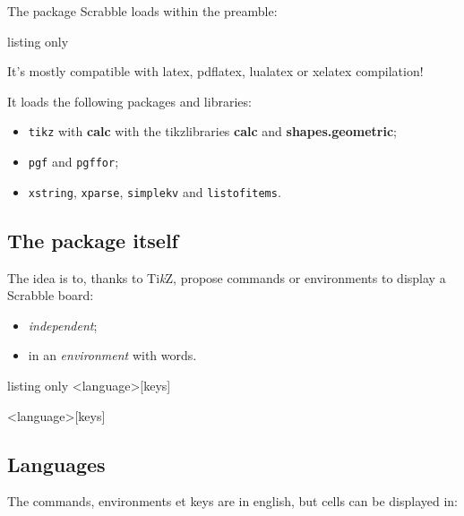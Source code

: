 \documentclass{article}
\newcommand\tikzlogo{Ti\textit{k}Z}
\let\TikZ\tikzlogo
\newcommand\Cle[1]{{\bfseries\sffamily\textlangle #1\textrangle}}
\begin{document}
The package \textsf{Scrabble} loads within the preamble:

\begin{PresentationCode}{listing only}
\usepackage{Scrabble}
\end{PresentationCode}

It's mostly compatible with \textsf{latex}, \textsf{pdflatex}, \textsf{lualatex} or \textsf{xelatex} compilation!

\medskip

It loads the following packages and libraries:

\begin{itemize}
	\item \texttt{tikz} with \Cle{calc} with the tikzlibraries \Cle{calc} and \Cle{shapes.geometric};
	\item \texttt{pgf} and \texttt{pgffor};
	\item \texttt{xstring}, \texttt{xparse}, \texttt{simplekv} and \texttt{listofitems}.
\end{itemize}

\subsection{The package itself}

The idea is to, thanks to \TikZ, propose commands or environments to display a Scrabble\texttrademark{} board:

\begin{itemize}
	\item \textit{independent};
	\item in an \textit{environment} with words.
\end{itemize}

\begin{PresentationCode}{listing only}
\ScrabbleBoard<language>[keys]

\begin{EnvScrabble}<language>[keys]
\end{EnvScrabble}
\end{PresentationCode}

\subsection{Languages}

The \textsf{commands}, \textsf{environments} et \textsf{keys} are in english, but cells can be displayed in:
\end{document}
